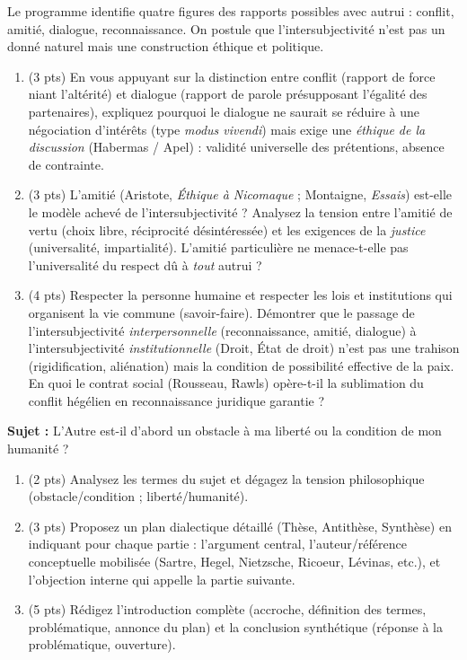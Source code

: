\documentclass[11pt]{article}
\begin{document}
\begin{exercice}
Le programme identifie quatre figures des rapports possibles avec autrui : conflit, amitié, dialogue, reconnaissance. On postule que l'intersubjectivité n'est pas un donné naturel mais une construction éthique et politique.
\begin{enumerate}
    \item (3 pts) En vous appuyant sur la distinction entre \og conflit \fg (rapport de force niant l'altérité) et \og dialogue \fg (rapport de parole présupposant l'égalité des partenaires), expliquez pourquoi le dialogue ne saurait se réduire à une négociation d'intérêts (type \textit{modus vivendi}) mais exige une \textit{éthique de la discussion} (Habermas / Apel) : validité universelle des prétentions, absence de contrainte.
    \item (3 pts) L'amitié (Aristote, \textit{Éthique à Nicomaque} ; Montaigne, \textit{Essais}) est-elle le modèle achevé de l'intersubjectivité ? Analysez la tension entre l'amitié de vertu (choix libre, réciprocité désintéressée) et les exigences de la \textit{justice} (universalité, impartialité). L'amitié particulière ne menace-t-elle pas l'universalité du respect dû à \textit{tout} autrui ?
    \item (4 pts) \og Respecter la personne humaine et respecter les lois et institutions qui organisent la vie commune \fg (savoir-faire). Démontrer que le passage de l'intersubjectivité \textit{interpersonnelle} (reconnaissance, amitié, dialogue) à l'intersubjectivité \textit{institutionnelle} (Droit, État de droit) n'est pas une trahison (rigidification, aliénation) mais la condition de possibilité effective de la paix. En quoi le \og contrat social \fg (Rousseau, Rawls) opère-t-il la sublimation du conflit hégélien en reconnaissance juridique garantie ?
\end{enumerate}
\end{exercice}

\begin{exercice}
\textbf{Sujet :} \og L'Autre est-il d'abord un obstacle à ma liberté ou la condition de mon humanité ? \fg
\begin{enumerate}
    \item (2 pts) Analysez les termes du sujet et dégagez la tension philosophique (obstacle/condition ; liberté/humanité).
    \item (3 pts) Proposez un plan dialectique détaillé (Thèse, Antithèse, Synthèse) en indiquant pour chaque partie : l'argument central, l'auteur/référence conceptuelle mobilisée (Sartre, Hegel, Nietzsche, Ricoeur, Lévinas, etc.), et l'objection interne qui appelle la partie suivante.
    \item (5 pts) Rédigez l'introduction complète (accroche, définition des termes, problématique, annonce du plan) et la conclusion synthétique (réponse à la problématique, ouverture).
\end{enumerate}
\end{exercice}
\end{document}
